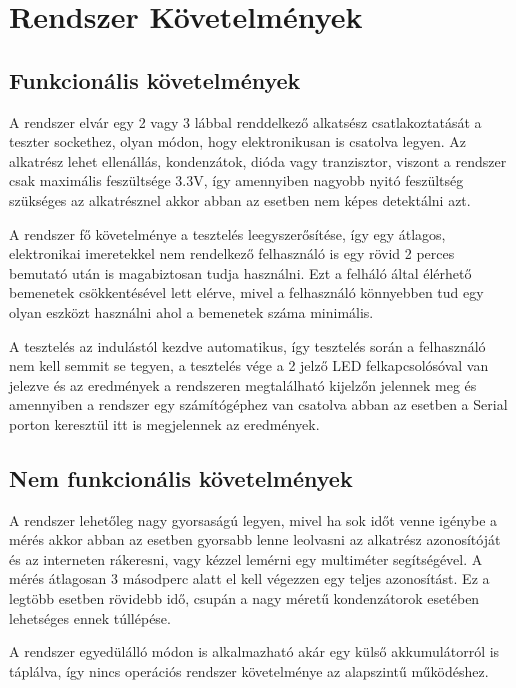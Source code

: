 \section{Rendszer Követelmények}

\subsection{Funkcionális követelmények}

A rendszer elvár egy 2 vagy 3 lábbal renddelkező alkatsész csatlakoztatását a 
teszter sockethez, olyan módon, hogy elektronikusan is csatolva legyen. 
Az alkatrész lehet ellenállás, kondenzátok, dióda vagy tranzisztor, viszont a 
rendszer csak maximális feszültsége 3.3V, így amennyiben nagyobb nyitó
feszültség szükséges az alkatrésznel akkor abban az esetben nem képes
detektálni azt.

A rendszer fő követelménye a tesztelés leegyszerősítése, így egy átlagos,
elektronikai imeretekkel nem rendelkező felhasználó is egy rövid 2 perces 
bemutató után is magabiztosan tudja használni. Ezt a felháló által élérhető
bemenetek csökkentésével lett elérve, mivel a felhasználó könnyebben 
tud egy olyan eszközt használni ahol a bemenetek száma minimális.

A tesztelés az indulástól kezdve automatikus, így tesztelés során a felhasználó
nem kell semmit se tegyen, a tesztelés vége a 2 jelző LED felkapcsolósóval van
jelezve és az eredmények a rendszeren megtalálható kijelzőn jelennek meg és 
amennyiben a rendszer egy számítógéphez van csatolva abban az esetben 
a Serial porton keresztül itt is megjelennek az eredmények.

\subsection{Nem funkcionális követelmények}

A rendszer lehetőleg nagy gyorsaságú legyen, mivel ha sok időt venne igénybe
a mérés akkor abban az esetben gyorsabb lenne leolvasni az alkatrész azonosítóját
és az interneten rákeresni, vagy kézzel lemérni egy multiméter segítségével.
A mérés átlagosan 3 másodperc alatt el kell végezzen egy teljes azonosítást. 
Ez a legtöbb esetben rövidebb idő, csupán
a nagy méretű kondenzátorok esetében lehetséges ennek túllépése.

A rendszer egyedülálló módon is alkalmazható akár egy külső 
akkumulátorról is táplálva, így nincs operációs rendszer követelménye
az alapszintű működéshez.

